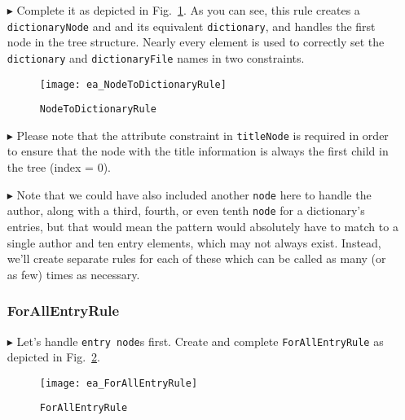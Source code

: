 \begin{itemize}
\item[$\blacktriangleright$] Complete it as depicted in Fig.~\ref{ea:NodeToDictionary_Complete}. As you can see, this rule creates a 
\texttt{dictionaryNode} and and its equivalent \texttt{dictionary}, and handles the first node in the tree structure. Nearly every
element is used to correctly set the \texttt{dictionary} and \texttt{dictionaryFile} names in two constraints.

\vspace{0.5cm}

\begin{figure}[htbp]
  \hspace{-0.7cm}
  \texttt{[image: ea\_NodeToDictionaryRule]}
  \caption{\texttt{NodeToDictionaryRule}}
  \label{ea:NodeToDictionary_Complete}
\end{figure}

\vspace{0.5cm}

\item[$\blacktriangleright$] Please note that the attribute constraint in \texttt{titleNode} is required in order to ensure that the node
with the title information is always the first child in the tree (index = 0). 

\newpage

\item[$\blacktriangleright$] Note that we could have also included another \texttt{node} here to handle the author, along with a third, fourth, or even
tenth \texttt{node} for a dictionary's entries, but that would mean the pattern would absolutely have to match to a single author and ten entry elements, which
may not always exist. Instead, we'll create separate rules for each of these which can be called as many (or as few) times as necessary.

\subsubsection{ForAllEntryRule} %

\item[$\blacktriangleright$] Let's handle \texttt{entry node}s first. Create and complete \texttt{For\-All\-Ent\-ry\-Rule} as depicted in
Fig.~\ref{ea:ForAllEntry_Complete}. 

\vspace{0.5cm}

\begin{figure}[htbp]
\hspace{-0.5cm}
  \texttt{[image: ea\_ForAllEntryRule]}
  \caption{\texttt{ForAllEntryRule}}
  \label{ea:ForAllEntry_Complete}
\end{figure}


\end{itemize}
